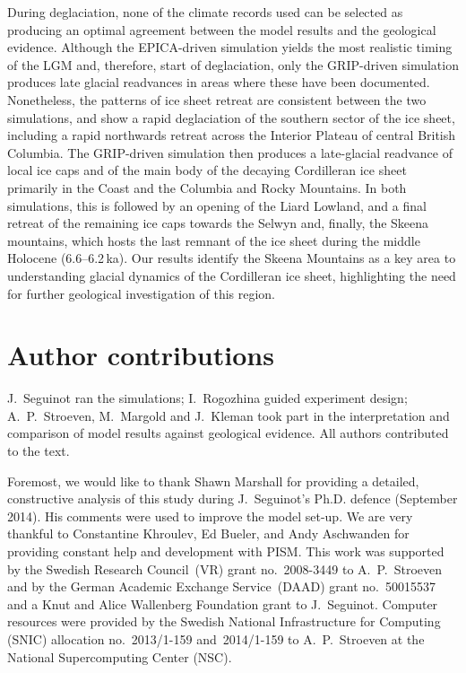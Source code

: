 \documentclass[tc, manuscript]{copernicus}
\begin{document}
During deglaciation, none of the climate records used can be selected as
producing an optimal agreement between the model results and the geological
evidence. Although the EPICA-driven simulation yields the most realistic timing
of the LGM and, therefore, start of deglaciation, only the GRIP-driven
simulation produces late glacial readvances in areas where these have been
documented. Nonetheless, the patterns of ice sheet retreat are consistent
between the two simulations, and show a rapid deglaciation of the southern
sector of the ice sheet, including a rapid northwards retreat across the Interior
Plateau of central British Columbia. The GRIP-driven simulation then produces a
late-glacial readvance of local ice caps and of the main body of the decaying
Cordilleran ice sheet primarily in the Coast and the Columbia and Rocky Mountains.
In both simulations, this is followed by an
opening of the Liard Lowland, and a final retreat of the remaining ice caps
towards the Selwyn and, finally, the Skeena mountains, which hosts the last
remnant of the ice sheet during the middle Holocene (6.6--6.2\,ka). Our results
identify the Skeena Mountains as a key area to understanding glacial dynamics
of the Cordilleran ice sheet, highlighting the need for further geological
investigation of this region.

\section*{Author contributions}
J.~Seguinot ran the simulations; I.~Rogozhina
guided experiment design; A.~P.~Stroeven, M.~Margold and J.~Kleman took part in
the interpretation and comparison of model results against geological evidence.
All authors contributed to the text.

\begin{acknowledgements}
Foremost, we would like to thank Shawn Marshall for providing a detailed,
constructive analysis of this study during J.~Seguinot's Ph.D. defence
(September 2014). His comments were used to improve the model set-up.
We are very thankful to Constantine Khroulev, Ed Bueler, and Andy Aschwanden for
providing constant help and development with PISM. This work was supported by the
Swedish Research Council~(VR) grant no.~2008-3449 to A.~P.~Stroeven and by the
German Academic Exchange Service~(DAAD) grant no.~50015537 and a Knut and Alice
Wallenberg Foundation grant to J.~Seguinot. Computer resources were provided
by the Swedish National Infrastructure for Computing (SNIC) allocation
no.~2013/1-159 and~2014/1-159 to A.~P.~Stroeven at the National Supercomputing
Center (NSC).
\end{acknowledgements}



\newpage

\end{document}
